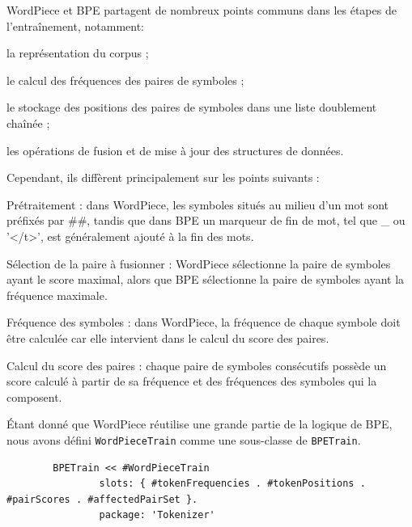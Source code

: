\documentclass[12pt,a4paper]{report}
\begin{document}
	WordPiece et BPE partagent de nombreux points communs dans les étapes de l’entraînement, notamment:
	
	\begin{itemizeFB}
		\item la représentation du corpus ;
		
		\item le calcul des fréquences des paires de symboles ;
		
		\item le stockage des positions des paires de symboles dans une liste doublement chaînée ;
		
		\item les opérations de fusion et de mise à jour des structures de données.
	\end{itemizeFB}
	
	Cependant, ils diffèrent principalement sur les points suivants :
	
	\begin{itemizeFB}
		\item Prétraitement : dans WordPiece, les symboles situés au milieu d’un mot sont préfixés par \#\#, tandis que dans BPE un marqueur de fin de mot, tel que \_ ou '</t>', est généralement ajouté à la fin des mots.
		
		\item Sélection de la paire à fusionner : WordPiece sélectionne la paire de symboles ayant le score maximal, alors que BPE sélectionne la paire de symboles ayant la fréquence maximale.
		
		\item Fréquence des symboles : dans WordPiece, la fréquence de chaque symbole doit être calculée car elle intervient dans le calcul du score des paires.
		
		\item Calcul du score des paires : chaque paire de symboles consécutifs possède un score calculé à partir de sa fréquence et des fréquences des symboles qui la composent.
	\end{itemizeFB}
	
	Étant donné que WordPiece réutilise une grande partie de la logique de BPE, nous avons défini \texttt{WordPieceTrain} comme une sous-classe de \texttt{BPETrain}.
	
	\begin{verbatim}
		BPETrain << #WordPieceTrain 
				slots: { #tokenFrequencies . #tokenPositions . #pairScores . #affectedPairSet }. 
				package: 'Tokenizer'
	\end{verbatim}
	
\end{document}
